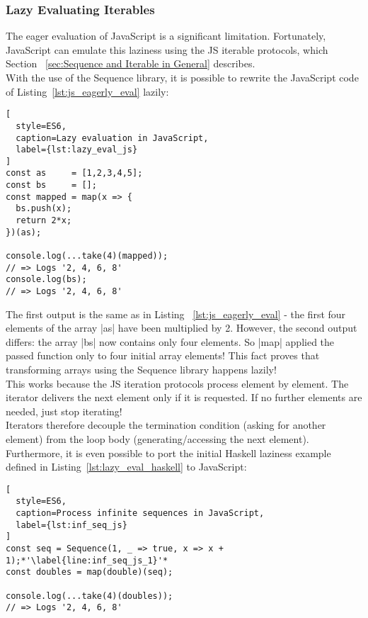 \subsubsection{Lazy Evaluating Iterables} %
\label{Lazy Evaluate Iterables}

The eager evaluation of JavaScript is a significant limitation. Fortunately,
JavaScript can emulate this laziness using the JS iterable protocols, which
Section ~\ref{sec:Sequence and Iterable in General} describes. \\ 

With the use of the Sequence library, it is possible to rewrite the JavaScript
code of Listing~\ref{lst:js_eagerly_eval} lazily:

\begin{lstlisting}[
  style=ES6,
  caption=Lazy evaluation in JavaScript,
  label={lst:lazy_eval_js}
]
const as     = [1,2,3,4,5];
const bs     = [];
const mapped = map(x => {
  bs.push(x);
  return 2*x;
})(as);

console.log(...take(4)(mapped));
// => Logs '2, 4, 6, 8'
console.log(bs);
// => Logs '2, 4, 6, 8'
\end{lstlisting}
The first output is the same as in Listing ~\ref{lst:js_eagerly_eval} - the
first four elements of the array |as| have been multiplied by 2. However, the
second output differs: the array |bs| now contains only four elements. So |map|
applied the passed function only to four initial array elements! This fact
proves that transforming arrays using the Sequence library happens lazily!\\
This works because the JS iteration protocols process element by element. The
iterator delivers the next element only if it is requested. If no further
elements are needed, just stop iterating! \\
Iterators therefore decouple the termination condition (asking for another
element) from the loop body (generating/accessing the next element).\\

Furthermore, it is even possible to port the initial Haskell laziness
example defined in Listing~\ref{lst:lazy_eval_haskell} to JavaScript:
\begin{lstlisting}[
  style=ES6,
  caption=Process infinite sequences in JavaScript,
  label={lst:inf_seq_js}
]
const seq = Sequence(1, _ => true, x => x + 1);*'\label{line:inf_seq_js_1}'*
const doubles = map(double)(seq);

console.log(...take(4)(doubles));
// => Logs '2, 4, 6, 8'
\end{lstlisting}

